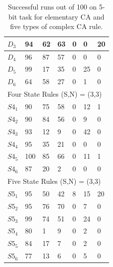 \documentclass{article}
\begin{document}
\begin{multicols}{2}
\begin{table}[!htb]
\begin{tabular}{|l|l|l|l|l|l|l|}
$D_{3}$ & 94 & 62 & 63 & 0 & 0 & 20 \\ \hline
$D_{4}$ & 96 & 87 & 57 & 0 & 0 & 0 \\ \hline
$D_{5}$ & 99 & 17 & 35 & 0 & 25 & 0 \\ \hline
$D_{6}$ & 64 & 58 & 27 & 0 & 1 & 0 \\ \hline
\multicolumn{7}{|l|}{Four State Rules (S,N) = (3,3)} \\ \hline
$S4_{1}$ & 90 & 75 & 58 & 0 & 12  & 1 \\ \hline
$S4_{2}$ & 90 & 84 & 56 & 0 & 9 & 0  \\ \hline
$S4_{3}$ & 93 & 12 & 9 & 0 & 42 & 0 \\ \hline
$S4_{4}$ & 95 & 35 & 21 & 0 & 0 & 0 \\ \hline
$S4_{5}$ & 100 & 85 & 66 & 0 & 11 & 1 \\ \hline
$S4_{6}$ & 87 & 20 & 2 & 0 & 0 & 0 \\ \hline
\multicolumn{7}{|l|}{Five State Rules (S,N) = (3,3)} \\ \hline
$S5_{1}$ & 95 & 50 & 42 & 8 & 15 & 20 \\ \hline
$S5_{2}$ & 95 & 76 & 70 & 0 & 7 & 0 \\ \hline
$S5_{3}$ & 99 & 74 & 51 & 0 & 24 & 0 \\ \hline
$S5_{4}$ & 80 & 1 & 9 & 0 & 2 & 0 \\ \hline
$S5_{5}$ & 84 & 17 & 7 & 0 & 2 & 0 \\ \hline
$S5_{6}$ & 77 & 13 & 6 & 0 & 5 & 0 \\ \hline
\end{tabular}
\caption{Successful runs out of 100 on 5-bit task for elementary CA and five 
    types of complex CA rule.}
\label{table:results}
\end{table}



\end{multicols}
\end{document}
